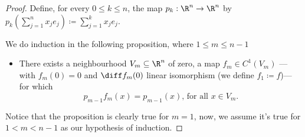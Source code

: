 \begin{proof}
Define, for every \(0 \leq k \leq n\), the map \(p_k: \R^n \to \R^n\) by
\(p_k(\sum_{j=1}^n x_j e_j) \coloneq \sum_{j=1}^k x_j e_j\).

We do induction in the following proposition, where \(1 \leq m \leq n - 1\)
\begin{itemize}\setlength\itemsep{0em}
\item There exists a neighbourhood \(V_m \subseteq \R^n\) of zero, a map \(f_m
  \in C^1(V_m)\) --- with \(f_m(0) = 0\) and \(\diff f_m(0)\) linear
  isomorphism (we define \(f_1 \coloneq f\))--- for which
  \[
    p_{m-1} f_m(x) = p_{m-1}(x)\text{, for all } x \in V_m.
  \]
\end{itemize}
Notice that the proposition is clearly true for \(m = 1\), now, we assume
it's true for \(1 < m < n - 1\) as our hypothesis of induction.


\end{proof}
